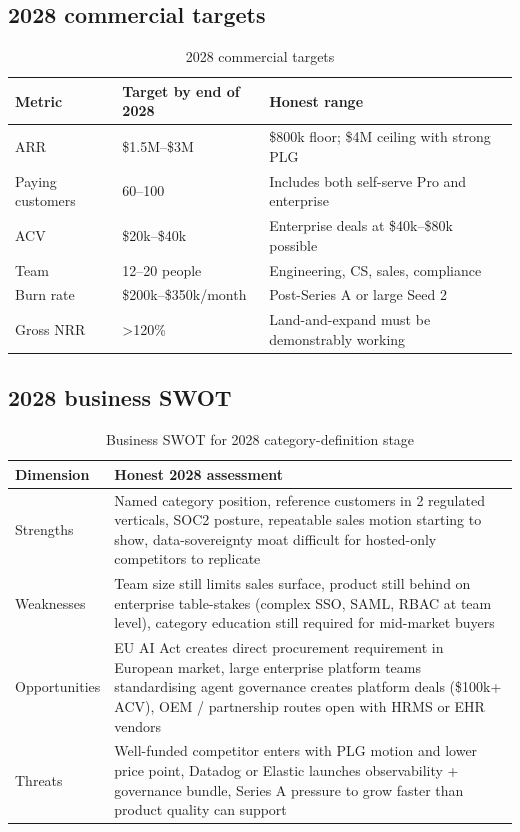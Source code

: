 \subsection{2028 commercial targets}

\begin{table}[H]
\centering
\renewcommand{\arraystretch}{1.45}
\begin{tabularx}{\textwidth}{@{}lXX@{}}
\toprule
\textbf{Metric} & \textbf{Target by end of 2028} & \textbf{Honest range} \\
\midrule
ARR & \$1.5M--\$3M & \$800k floor; \$4M ceiling with strong PLG \\
Paying customers & 60--100 & Includes both self-serve Pro and enterprise \\
ACV & \$20k--\$40k & Enterprise deals at \$40k--\$80k possible \\
Team & 12--20 people & Engineering, CS, sales, compliance \\
Burn rate & \$200k--\$350k/month & Post-Series A or large Seed 2 \\
Gross NRR & \textgreater{}120\% & Land-and-expand must be demonstrably working \\
\bottomrule
\end{tabularx}
\caption{2028 commercial targets}
\end{table}

\subsection{2028 business SWOT}

\begin{table}[H]
\centering
\renewcommand{\arraystretch}{1.45}
\begin{tabularx}{\textwidth}{@{}lX@{}}
\toprule
\textbf{Dimension} & \textbf{Honest 2028 assessment} \\
\midrule
Strengths & Named category position, reference customers in 2 regulated verticals, SOC2 posture, repeatable sales motion starting to show, data-sovereignty moat difficult for hosted-only competitors to replicate \\
Weaknesses & Team size still limits sales surface, product still behind on enterprise table-stakes (complex SSO, SAML, RBAC at team level), category education still required for mid-market buyers \\
Opportunities & EU AI Act creates direct procurement requirement in European market, large enterprise platform teams standardising agent governance creates platform deals (\$100k+ ACV), OEM / partnership routes open with HRMS or EHR vendors \\
Threats & Well-funded competitor enters with PLG motion and lower price point, Datadog or Elastic launches observability + governance bundle, Series A pressure to grow faster than product quality can support \\
\bottomrule
\end{tabularx}
\caption{Business SWOT for 2028 category-definition stage}
\end{table}

